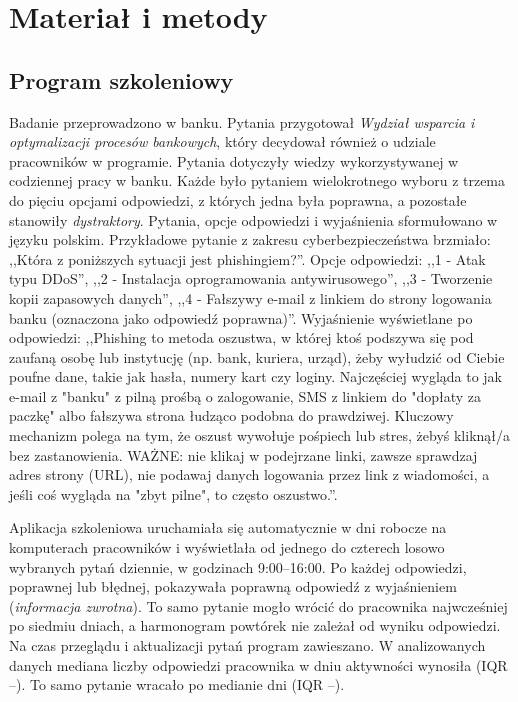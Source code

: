 \section{Materiał i metody}

\subsection{Program szkoleniowy}
Badanie przeprowadzono w banku. Pytania przygotował \textit{Wydział wsparcia i optymalizacji procesów
bankowych}, który decydował również o udziale pracowników w programie. Pytania dotyczyły wiedzy
wykorzystywanej w codziennej pracy w banku. Każde było pytaniem wielokrotnego wyboru z trzema do pięciu
opcjami odpowiedzi, z których jedna była poprawna, a pozostałe stanowiły \emph{dystraktory}.
Pytania, opcje odpowiedzi i wyjaśnienia sformułowano w języku polskim. Przykładowe pytanie z zakresu cyberbezpieczeństwa brzmiało:
,,Która z poniższych sytuacji jest phishingiem?''. Opcje odpowiedzi: 
,,1 - Atak typu DDoS'',
,,2 - Instalacja oprogramowania antywirusowego'',
,,3 - Tworzenie kopii zapasowych danych'',
,,4 - Fałszywy e-mail z linkiem do strony logowania banku (oznaczona jako odpowiedź poprawna)''.
Wyjaśnienie wyświetlane po odpowiedzi:
,,Phishing to metoda oszustwa, w której ktoś podszywa się pod zaufaną osobę lub instytucję (np. bank, kuriera, urząd), żeby wyłudzić od Ciebie poufne dane, takie jak hasła, numery kart czy loginy. Najczęściej wygląda to jak e-mail z "banku" z pilną prośbą o zalogowanie, SMS z linkiem do "dopłaty za paczkę" albo fałszywa strona łudząco podobna do prawdziwej. Kluczowy mechanizm polega na tym, że oszust wywołuje pośpiech lub stres, żebyś kliknął/a bez zastanowienia. WAŻNE: nie klikaj w podejrzane linki, zawsze sprawdzaj adres strony (URL), nie podawaj danych logowania przez link z wiadomości, a jeśli coś wygląda na "zbyt pilne", to często oszustwo.''.

Aplikacja szkoleniowa uruchamiała się automatycznie w dni robocze na komputerach pracowników
i wyświetlała od jednego do czterech losowo wybranych pytań dziennie, w godzinach 9:00--16:00.
Po każdej odpowiedzi, poprawnej lub błędnej, pokazywała poprawną odpowiedź z wyjaśnieniem (\emph{informacja zwrotna}). To samo pytanie
mogło wrócić do pracownika najwcześniej po siedmiu dniach, a harmonogram powtórek nie zależał od wyniku
odpowiedzi. Na czas przeglądu i aktualizacji pytań program zawieszano. W analizowanych danych mediana
liczby odpowiedzi pracownika w dniu aktywności wynosiła \DailyMedian{} (IQR \DailyQOne--\DailyQThree).
To samo pytanie wracało po medianie \GapMedian{} dni (IQR \GapQOne--\GapQThree).

